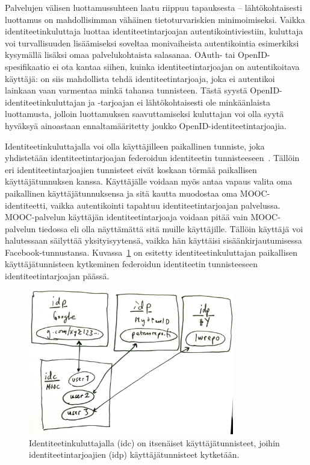 \documentclass[finnish,gradu]{tktltiki}
\begin{document}
  Palvelujen välisen luottamussuhteen laatu riippuu tapauksesta -- lähtökohtaisesti luottamus on mahdollisimman vähäinen tietoturvariskien minimoimiseksi. Vaikka identiteetinkuluttaja luottaa identiteetintarjoajan autentikointiviestiin, kuluttaja voi turvallisuuden lisäämiseksi soveltaa monivaiheista autentikointia esimerkiksi kysymällä lisäksi omaa palvelukohtaista salasanaa. OAuth- tai OpenID-spesifikaatio ei ota kantaa siihen, kuinka identiteetintarjoajan on autentikoitava käyttäjä: on siis mahdollista tehdä identiteetintarjoaja, joka ei autentikoi lainkaan vaan varmentaa minkä tahansa tunnisteen. Tästä syystä OpenID-identiteetinkuluttajan ja -tarjoajan ei lähtökohtaisesti ole minkäänlaista luottamusta, jolloin luottamuksen saavuttamiseksi kuluttajan voi olla syytä hyväksyä ainoastaan ennaltamääritetty joukko OpenID-identiteetintarjoajia.

  Identiteetinkuluttajalla voi olla käyttäjilleen paikallinen tunniste, joka yhdistetään identiteetintarjoajan federoidun identiteetin tunnisteeseen~\cite{id_delegation_2005}. Tällöin eri identiteetintarjoajien tunnisteet eivät koskaan törmää paikallisen käyttäjätunnuksen kanssa. Käyttäjälle voidaan myös antaa vapaus valita oma paikallinen käyttäjätunnuksensa ja sitä kautta muodostaa oma MOOC-identiteetti, vaikka autentikointi tapahtuu identiteetintarjoajan palvelussa. MOOC-palvelun käyttäjän identiteetintarjoaja voidaan pitää vain MOOC-palvelun tiedossa eli olla näyttämättä sitä muille käyttäjille. Tällöin käyttäjä voi halutessaan säilyttää yksityisyytensä, vaikka hän käyttäisi sisäänkirjautumisessa Facebook-tunnustansa. Kuvassa~\ref{fig:uid_mapping} on esitetty identiteetinkuluttajan paikallisen käyttäjätunnisteen kytkeminen federoidun identiteetin tunnisteeseen identiteetintarjoajan päässä.

  \begin{figure}
    \centering
    \includegraphics[width=0.8\textwidth]{images/uid_mapping.jpg}
    \caption{Identiteetinkuluttajalla (idc) on itsenäiset käyttäjätunnisteet, joihin identiteetintarjoajien (idp) käyttäjätunnisteet kytketään.}
    \label{fig:uid_mapping}
  \end{figure}
\end{document}
